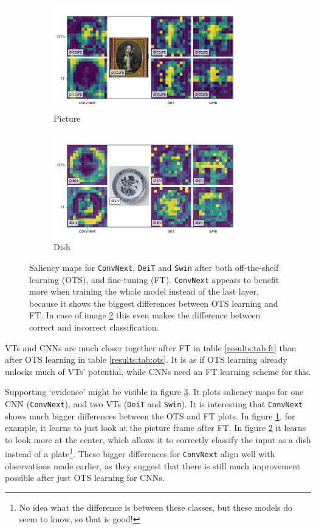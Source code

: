 \begin{figure}[tb]
    \centering
    \begin{subfigure}{0.49\textwidth}
    \includegraphics[width=8cm]{img/img011_salience.png}
    \caption{Picture}
    \label{results:img:sal:picture}
    \end{subfigure}
    \begin{subfigure}{0.49\textwidth}
    \includegraphics[width=8cm]{img/img005_salience.png}
    \caption{Dish}
    \label{results:img:sal:dish}
    \end{subfigure}
    \caption{Saliency maps for \texttt{ConvNext}, \texttt{DeiT} and \texttt{Swin} after both off-the-shelf learning (OTS), and fine-tuning (FT). \texttt{ConvNext} appears to benefit more when training the whole model instead of the last layer, because it shows the biggest differences between OTS learning and FT. In case of image \ref{results:img:sal:dish} this even makes the difference between correct and incorrect classification.}
    \label{results:img:sal}
\end{figure}

VTs and CNNs are much closer together after FT in table \ref{results:tab:ft} than after OTS learning in table \ref{results:tab:ots}. It is as if OTS learning already unlocks much of VTs' potential, while CNNs need an FT learning scheme for this.

Supporting `evidence' might be visible in figure \ref{results:img:sal}. It plots saliency maps for one CNN (\texttt{ConvNext}), and two VTs (\texttt{DeiT} and \texttt{Swin}). It is interesting that \texttt{ConvNext} shows much bigger differences between the OTS and FT plots. In figure \ref{results:img:sal:picture}, for example, it learns to just look at the picture frame after FT. In figure \ref{results:img:sal:dish} it learns to look more at the center, which allows it to correctly classify the input as a dish instead of a plate\footnote{No idea what the difference is between these classes, but these models do seem to know, so that is good!}. %
These bigger differences for \texttt{ConvNext} align well with observations made earlier, as they suggest that there is still much improvement possible after just OTS learning for CNNs.

